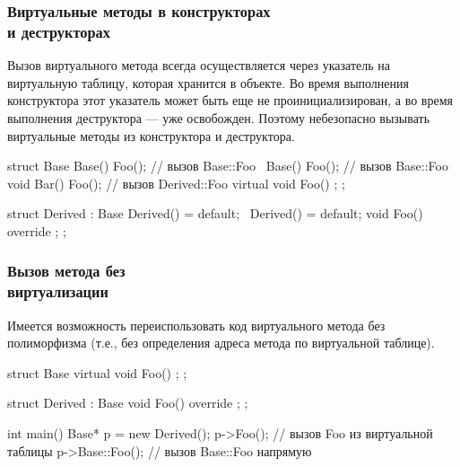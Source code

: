 \documentclass[compress, 8pt]{beamer}
\begin{document}
\begin{frame}[fragile]
\begin{columns}
\begin{column}{0.5\textwidth}
        \end{column}

    \end{columns}

\end{frame}

\begin{frame}[fragile]

    \frametitle{Виртуальные методы в конструкторах \\ и деструкторах}

    Вызов виртуального метода всегда осуществляется через указатель на виртуальную
    таблицу, которая хранится в объекте.
    Во время выполнения конструктора этот указатель может быть еще не
    проинициализирован, а во время выполнения деструктора --- уже освобожден.
    Поэтому небезопасно вызывать виртуальные методы из конструктора и деструктора.

    \begin{myinplacelisting}[minted language=cpp]
struct Base {
    Base() { Foo(); } // вызов Base::Foo
    ~Base() { Foo(); } // вызов Base::Foo
    void Bar() { Foo(); } // вызов Derived::Foo
    virtual void Foo() {};
};

struct Derived : Base {
    Derived() = default;
    ~Derived() = default;
    void Foo() override {};
};
    \end{myinplacelisting}

\end{frame}

\begin{frame}[fragile]

    \frametitle{Вызов метода без \\ виртуализации}

    Имеется возможность переиспользовать код виртуального метода без
    полиморфизма (т.е., без определения адреса метода по виртуальной таблице).

    \begin{myinplacelisting}[minted language=cpp]
struct Base {
    virtual void Foo() {};
};

struct Derived : Base {
    void Foo() override {};
};

int main() {
    Base* p = new Derived();
    p->Foo(); // вызов Foo из виртуальной таблицы
    p->Base::Foo(); // вызов Base::Foo напрямую
}
    \end{myinplacelisting}

\end{frame}
\end{document}
